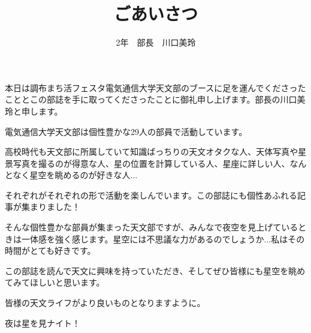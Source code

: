 \documentclass[a4paper,10pt]{jarticle}
\begin{document}
 
\title{ごあいさつ}
\author{2年　部長　川口美玲}
\date{}
\maketitle

\begin{center}


	\phantom{a}\par
	本日は調布まち活フェスタ電気通信大学天文部のブースに足を運んでくださったこととこの部誌を手に取ってくださったことに御礼申し上げます。部長の川口美玲と申します。
	
	
	\phantom{a}\par
	電気通信大学天文部は個性豊かな29人の部員で活動しています。
	
	
	\phantom{a}\par
	高校時代も天文部に所属していて知識ばっちりの天文オタクな人、天体写真や星景写真を撮るのが得意な人、星の位置を計算している人、星座に詳しい人、なんとなく星空を眺めるのが好きな人...
	
	
	\phantom{a}\par
	それぞれがそれぞれの形で活動を楽しんでいます。この部誌にも個性あふれる記事が集まりました！
	
	
	\phantom{a}\par
	そんな個性豊かな部員が集まった天文部ですが、みんなで夜空を見上げているときは一体感を強く感じます。星空には不思議な力があるのでしょうか...私はその時間がとても好きです。
	
	
	\phantom{a}\par
	この部誌を読んで天文に興味を持っていただき、そしてぜひ皆様にも星空を眺めてみてほしいと思います。
	
	
	\phantom{a}\par
	皆様の天文ライフがより良いものとなりますように。
	
	
	\phantom{a}\par
	夜は星を見ナイト！
	
	
\end{center}
\end{document}
